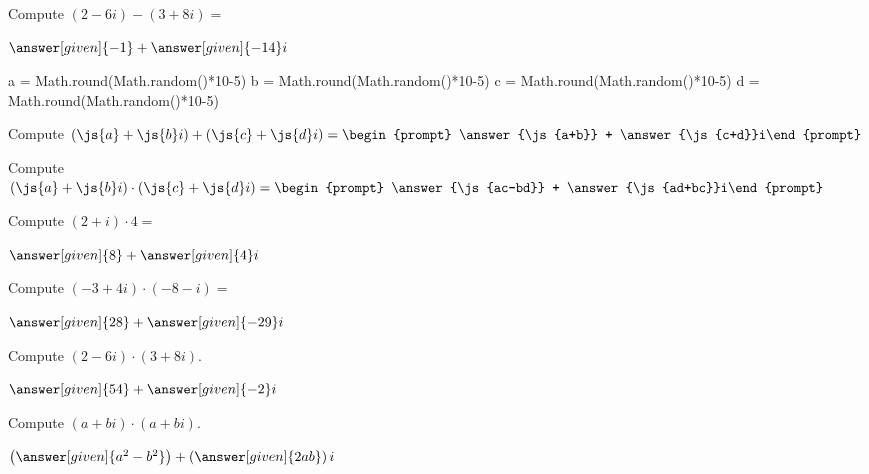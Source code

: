 \documentclass[nooutcomes]{ximera}
\begin{document}
\begin{problem}
Compute $(2-6i) - (3+8i) =$ 
\begin{prompt}
	$\answer[given]{-1} + \answer[given]{-14}i$
\end{prompt}
\end{problem}

\begin{javascript}
  a = Math.round(Math.random()*10-5)
  b = Math.round(Math.random()*10-5)
  c = Math.round(Math.random()*10-5)
  d = Math.round(Math.random()*10-5)
\end{javascript}

\begin{problem}
Compute $(\js{a}+\js{b}i)+(\js{c}+\js{d}i) = \begin{prompt} \answer{\js{a+b}} + \answer{\js{c+d}}i\end{prompt}$
\end{problem}

\begin{problem}
Compute $(\js{a}+\js{b}i)\cdot(\js{c}+\js{d}i) = \begin{prompt} \answer{\js{ac-bd}} + \answer{\js{ad+bc}}i\end{prompt}$
\end{problem}


\begin{problem}
Compute $(2+i) \cdot 4 =$
\begin{prompt}
	$\answer[given]{8} + \answer[given]{4}i$
\end{prompt}
\end{problem}



\begin{problem}
Compute $(-3 + 4i) \cdot (-8 - i) =$
\begin{prompt}
	$\answer[given]{28} + \answer[given]{-29}i$
\end{prompt}
\end{problem}




\begin{problem}
Compute $(2-6i) \cdot (3+8i)$.
\begin{prompt}
	$\answer[given]{54} + \answer[given]{-2}i$
\end{prompt}
\end{problem}


\begin{problem}
Compute $(a+bi) \cdot (a+bi)$.
\begin{prompt}
	$\left(\answer[given]{a^2-b^2}\right) + \left(\answer[given]{2ab}\right)i$
\end{prompt}
\end{problem}
\end{document}
